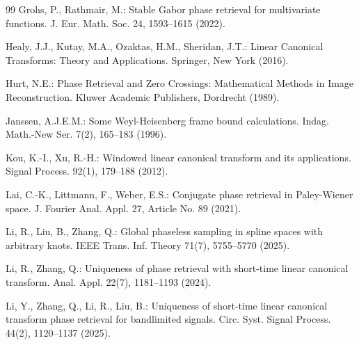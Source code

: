 \documentclass[11pt, reqno]{amsart}
\numberwithin{equation}{section}
\begin{document}
\begin{thebibliography}{99}
Grohs, P., Rathmair, M.: Stable Gabor phase retrieval for multivariate functions. J. Eur. Math. Soc. 24, 1593--1615 (2022).



Healy, J.J., Kutay, M.A., Ozaktas, H.M., Sheridan, J.T.: Linear
Canonical Transforms: Theory and Applications. Springer, New York (2016).



Hurt, N.E.: Phase Retrieval and Zero Crossings: Mathematical Methods in Image Reconstruction. Kluwer Academic Publishers, Dordrecht (1989).


Janssen, A.J.E.M.: Some Weyl-Heisenberg frame bound calculations. Indag. Math.-New Ser. 7(2), 165--183 (1996).

Kou, K.-I., Xu, R.-H.: Windowed linear canonical transform and its applications. Signal Process. 92(1), 179--188 (2012).

	Lai, C.-K., Littmann, F., Weber, E.S.: Conjugate phase retrieval in Paley-Wiener space. J. Fourier Anal. Appl. 27,  Article No. 89 (2021).

    Li, R., Liu, B., Zhang, Q.: Global phaseless sampling in spline spaces with arbitrary knots. IEEE Trans. Inf. Theory 71(7), 5755--5770 (2025).

    Li, R., Zhang, Q.: Uniqueness of phase retrieval with short-time linear canonical transform. Anal. Appl. 22(7), 1181--1193 (2024).


    Li, Y., Zhang, Q., Li, R., Liu, B.: Uniqueness of short-time linear canonical transform phase retrieval for bandlimited signals. Circ. Syst. Signal Process. 44(2), 1120--1137 (2025).


\end{thebibliography}
\end{document}
